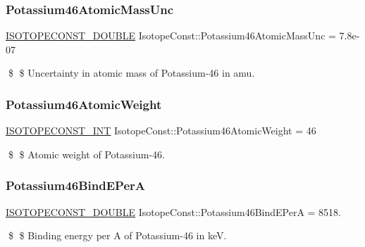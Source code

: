 \subsubsection{\texorpdfstring{Potassium46\+Atomic\+Mass\+Unc}{Potassium46AtomicMassUnc}}
{\footnotesize\ttfamily \mbox{\hyperlink{group___isotope_const-_macros_ga8f45a7272ce02c0b4c65c44636ed719a}{I\+S\+O\+T\+O\+P\+E\+C\+O\+N\+S\+T\+\_\+\+D\+O\+U\+B\+LE}} Isotope\+Const\+::\+Potassium46\+Atomic\+Mass\+Unc = 7.\+8e-\/07}

\$ \$ Uncertainty in atomic mass of Potassium-\/46 in amu. \mbox{\label{group___isotope_const-_potassium-_k46_gaa914276660f5213a4f463f9544022f65}} 
\subsubsection{\texorpdfstring{Potassium46\+Atomic\+Weight}{Potassium46AtomicWeight}}
{\footnotesize\ttfamily \mbox{\hyperlink{group___isotope_const-_macros_ga5f18360b3e99483a35c32d789e62621c}{I\+S\+O\+T\+O\+P\+E\+C\+O\+N\+S\+T\+\_\+\+I\+NT}} Isotope\+Const\+::\+Potassium46\+Atomic\+Weight = 46}

\$ \$ Atomic weight of Potassium-\/46. \mbox{\label{group___isotope_const-_potassium-_k46_ga0f8a3060eaa2e22066291df3734add8a}} 
\subsubsection{\texorpdfstring{Potassium46\+Bind\+E\+PerA}{Potassium46BindEPerA}}
{\footnotesize\ttfamily \mbox{\hyperlink{group___isotope_const-_macros_ga8f45a7272ce02c0b4c65c44636ed719a}{I\+S\+O\+T\+O\+P\+E\+C\+O\+N\+S\+T\+\_\+\+D\+O\+U\+B\+LE}} Isotope\+Const\+::\+Potassium46\+Bind\+E\+PerA = 8518.}

\$ \$ Binding energy per A of Potassium-\/46 in keV. \mbox{\label{group___isotope_const-_potassium-_k46_ga60e1b9f8dc87c49c68ee324545b73425}} 
